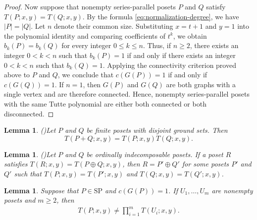 \documentclass[11pt,a4paper]{article}
\newtheorem{lemma}[theorem]{Lemma}
\begin{document}
\begin{proof}
Now suppose that nonempty series-parallel posets $P$ and $Q$
satisfy $T(P;x,y)=T(Q;x,y)$.
By the formula \eqref{eq:normalization-degree}, we have $|P|=|Q|$.
Let $n$ denote their common size.
Substituting $x=t+1$ and $y=1$ into the polynomial identity
and comparing coefficients of $t^k$, we obtain
$b_k(P)=b_k(Q)$ for every integer $0\leq k\leq n$.
Thus, if $n\geq 2$, there exists an integer $0<k<n$
such that $b_k(P)=1$ if and only if there exists an integer
$0<k<n$ such that $b_k(Q)=1$.
Applying the connectivity criterion proved above to $P$ and $Q$,
we conclude that $c(G(P))=1$ if and only if $c(G(Q))=1$.
If $n=1$, then $G(P)$ and $G(Q)$ are both graphs
with a single vertex and are therefore connected.
Hence, nonempty series-parallel posets with the same Tutte polynomial
are either both connected or both disconnected.
\end{proof}

\begin{lemma}(\cite{Gordon1993})\label{lem:sum-formulas}
Let $P$ and $Q$ be finite posets with disjoint ground sets. Then
\begin{equation}\label{eq:direct-sum}
T(P+Q;x,y)=T(P;x,y)T(Q;x,y).
\end{equation}
\end{lemma}

\begin{lemma}(\cite{Gordon1996})\label{lem:ordinal-recovery}
Let $P$ and $Q$ be ordinally indecomposable posets.
If a poset $R$ satisfies $T(R;x,y)=T(P\oplus Q;x,y)$,
then $R=P'\oplus Q'$ for some posets $P'$ and $Q'$
such that $T(P;x,y)=T(P';x,y)$ and $T(Q;x,y)=T(Q';x,y)$.
\end{lemma}

\begin{lemma}\label{lem:no-grouping}
Suppose that $P\in\mathrm{SP}$ and $c(G(P))=1$.
If $U_1,\ldots,U_m$ are nonempty posets and $m\geq 2$, then
\begin{eqnarray*}
T(P;x,y)\neq\prod_{i=1}^{m}T(U_i;x,y).
\end{eqnarray*}
\end{lemma}
\end{document}
